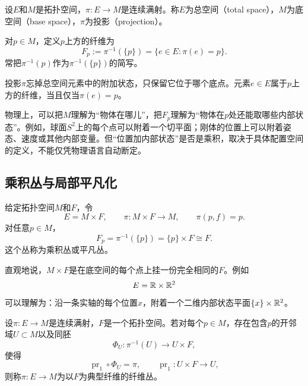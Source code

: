 \begin{definition}[投影与纤维]
设$E$和$M$是拓扑空间，$\pi:E\to M$是连续满射。称$E$为总空间（total space），$M$为底空间（base space），$\pi$为投影（projection）。

对$p\in M$，定义$p$上方的纤维为
\[
    F_p:=\pi^{-1}(\{p\})
    =\{e\in E:\pi(e)=p\}.
\]
常把$\pi^{-1}(p)$作为$\pi^{-1}(\{p\})$的简写。
\end{definition}

投影$\pi$忘掉总空间元素中的附加状态，只保留它位于哪个底点。元素$e\in E$属于$p$上方的纤维，当且仅当$\pi(e)=p$。

\begin{center}
\end{center}

物理上，可以把$M$理解为“物体在哪儿”，把$F_p$理解为“物体在$p$处还能取哪些内部状态”。例如，球面$S^2$上的每个点可以附着一个切平面；刚体的位置上可以附着姿态、速度或其他内部变量。但“位置加内部状态”是否是乘积，取决于具体配置空间的定义，不能仅凭物理语言自动断定。

\subsection{乘积丛与局部平凡化}

\begin{definition}[乘积丛]
给定拓扑空间$M$和$F$，令
\[
    E=M\times F,
    \qquad
    \pi:M\times F\longrightarrow M,
    \qquad
    \pi(p,f)=p.
\]
对任意$p\in M$，
\[
    F_p=\pi^{-1}(\{p\})=\{p\}\times F\cong F.
\]
这个丛称为乘积丛或平凡丛。
\end{definition}

直观地说，$M\times F$是在底空间的每个点上挂一份完全相同的$F$。例如
\[
    E=\mathbb{R}\times\mathbb{R}^2
\]
可以理解为：沿一条实轴的每个位置$x$，附着一个二维内部状态平面$\{x\}\times\mathbb{R}^2$。

\begin{definition}[纤维丛]
设$\pi:E\to M$是连续满射，$F$是一个拓扑空间。若对每个$p\in M$，存在包含$p$的开邻域$U\subset M$以及同胚
\[
    \Phi_U:\pi^{-1}(U)\longrightarrow U\times F,
\]
使得
\[
    \operatorname{pr}_1\circ\Phi_U=\pi,
    \qquad
    \operatorname{pr}_1:U\times F\to U,
\]
则称$\pi:E\to M$为以$F$为典型纤维的纤维丛。
\end{definition}

